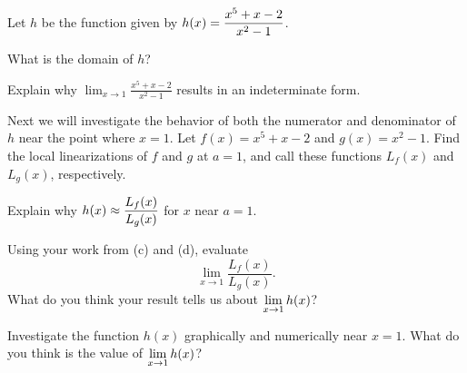 \begin{pa} \label{PA:3.7}
Let $h$ be the function given by $\displaystyle h(x) = \frac{x^5 + x - 2}{x^2 - 1}$.
\ba
	\item What is the domain of $h$?
	\item Explain why $\displaystyle\lim_{x \to 1} \frac{x^5 + x
- 2}{x^2 - 1}$ results in an indeterminate form.
	\item Next we will investigate the behavior of both the numerator and denominator of $h$ near the point where $x = 1$.  Let $f(x) = x^5 + x - 2$
and $g(x) = x^2 - 1$. Find the local linearizations of $f$ and $g$ at $a = 1$, and call these functions $L_f(x)$ and $L_g(x)$, respectively.
	\item Explain why $\displaystyle h(x) \approx \frac{L_f(x)}{L_g(x)}$ for $x$ near $a = 1$.
	\item Using your work from (c) and (d), evaluate 
	$$\lim_{x \to 1} \frac{L_f(x)}{L_g(x)}.$$
	What do you think your result tells us about $\displaystyle \lim_{x \to 1} h(x)$?
	\item Investigate the function $h(x)$ graphically and numerically near $x = 1$.  What do you think is the value of $\displaystyle \lim_{x \to 1} h(x)$?
\ea
\end{pa} 
\afterpa